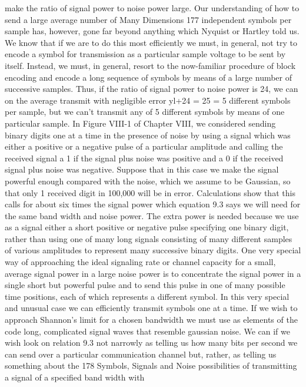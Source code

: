 {{{{{{{{{{{make the ratio of signal power to noise power large.
Our understanding of how to send a large average number of
Many Dimensions
177
independent symbols per sample has, however, gone far beyond
anything which Nyquist or Hartley told us. We know that if we
are to do this most efficiently we must, in general, not try to
encode a symbol for transmission as a particular sample voltage
to be sent by itself. Instead, we must, in general, resort to the
now-familiar procedure of block encoding and encode a long
sequence of symbols by means of a large number of successive
samples. Thus, if the ratio of signal power to noise power is 24,
we can on the average transmit with negligible error yl+24 =
\/25 = 5 different symbols per sample, but we can’t transmit any
of 5 different symbols by means of one particular sample.
In Figure VIII-1 of Chapter VIII, we considered sending binary
digits one at a time in the presence of noise by using a signal which
was either a positive or a negative pulse of a particular amplitude
and calling the received signal a 1 if the signal plus noise was
positive and a 0 if the received signal plus noise was negative.
Suppose that in this case we make the signal powerful enough
compared with the noise, which we assume to be Gaussian, so that
only 1 received digit in 100,000 will be in error. Calculations show
that this calls for about six times the signal power which equation
9.3 says we will need for the same band width and noise power.
The extra power is needed because we use as a signal either a short
positive or negative pulse specifying one binary digit, rather than
using one of many long signals consisting of many different samples
of various amplitudes to represent many successive binary digits.
One very special way of approaching the ideal signaling rate or
channel capacity for a small, average signal power in a large noise
power is to concentrate the signal power in a single short but
powerful pulse and to send this pulse in one of many possible time
positions, each of which represents a different symbol. In this very
special and unusual case we can efficiently transmit symbols one
at a time.
If we wish to approach Shannon’s limit for a chosen bandwidth
we must use as elements of the code long, complicated signal waves
that resemble gaussian noise.
We can if we wish look on relation 9.3 not narrowly as telling
us how many bits per second we can send over a particular communication
channel but, rather, as telling us something about the
178
Symbols, Signals and Noise
possibilities of transmitting a signal of a specified band width with
}}}}}}}}}}}
